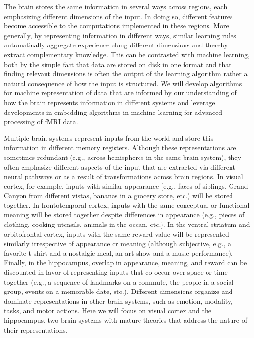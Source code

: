 \let\tilde\widetilde
\def\SS{{\mathbb S}}
\def\X{{\mathbb X}}
\def\bb{b}
\def\noisesd{\sigma}
\def\C{{\mathcal C}}
\def\A{{\mathcal A}}
\def\bigbracket#1#2#3{
\left[ 
\mbox{\begin{minipage}{#1}{
\vskip#2
#3
\vskip#2
\mbox{\ }
}\end{minipage}}
\right]
}

\label{sec:aim2}

The brain stores the same information in several ways across regions, 
each emphasizing different dimensions
of the input. In doing so, different features become accessible to the 
computations implemented in these regions. More
generally, by representing information in different ways, similar
learning rules automatically aggregate experience along
different dimensions and thereby extract complementary
knowledge. This can be contrasted with machine learning, both by the
simple fact that data are stored on disk in one format and that
finding relevant dimensions is often the output of the learning
algorithm rather a natural consequence of how the input is structured.
We will develop algorithms for machine representation of data that are
informed by our understanding of how the brain represents information
in different systems and leverage developments in embedding algorithms
in machine learning for advanced processing of fMRI data.

\biobackground{} Multiple brain systems represent inputs from the
world and store this information in different memory registers.
Although these representations are sometimes redundant (e.g., across
hemispheres in the same brain system), they often emphasize different
aspects of the input that are extracted via different neural pathways
or as a result of transformations across brain regions. In visual
cortex, for example, inputs with similar appearance (e.g.,
faces of siblings, Grand Canyon from different vistas, bananas
in a grocery store, etc.) will be stored together. In frontotemporal
cortex, inputs with the same conceptual or
functional meaning will be stored together despite differences in
appearance (e.g., pieces of clothing, cooking utensils, animals in the
ocean, etc.). In the ventral striatum and orbitofrontal cortex,
inputs with the same reward value will be represented
similarly irrespective of appearance or meaning (although subjective,
e.g., a favorite t-shirt and a nostalgic meal, an art show and a music
performance). Finally, in the hippocampus, overlap in appearance,
meaning, and reward can be discounted in favor of representing inputs
that co-occur over space or time together (e.g., a sequence of
landmarks on a commute, the people in a social group, events on a
memorable date, etc.). Different dimensions organize and
dominate representations in other brain systems, such as emotion,
modality, tasks, and motor actions. Here we will focus on
visual cortex and the hippocampus, two brain systems with mature
theories that address the nature of their representations.

